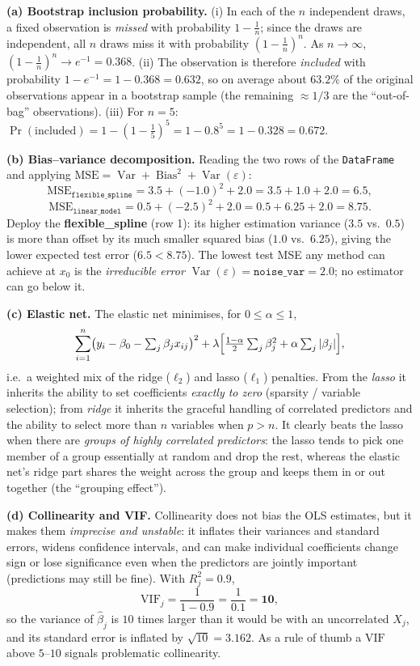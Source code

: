 \documentclass[11pt,a4paper]{article}
\begin{document}
\ifdefined\withsolutions
\begin{solutionbox}
\textbf{(a) Bootstrap inclusion probability.}
(i) In each of the $n$ independent draws, a fixed observation is \emph{missed} with probability
$1-\tfrac1n$; since the draws are independent, all $n$ draws miss it with probability
$(1-\tfrac1n)^n$. As $n\to\infty$, $(1-\tfrac1n)^n\to e^{-1}=\mathbf{0.368}$.
(ii) The observation is therefore \emph{included} with probability $1-e^{-1}=1-0.368=0.632$, so
on average about $\mathbf{63.2\%}$ of the original observations appear in a bootstrap sample
(the remaining $\approx 1/3$ are the ``out-of-bag'' observations).
(iii) For $n=5$: $\Pr(\text{included})=1-(1-\tfrac15)^5=1-0.8^{5}=1-0.328=\mathbf{0.672}$.

\medskip
\textbf{(b) Bias--variance decomposition.}
Reading the two rows of the \texttt{DataFrame} and applying
$\text{MSE}=\operatorname{Var}+\operatorname{Bias}^2+\operatorname{Var}(\varepsilon)$:
\[
  \text{MSE}_{\texttt{flexible\_spline}}=3.5+(-1.0)^2+2.0=3.5+1.0+2.0=\mathbf{6.5},
\]
\[
  \text{MSE}_{\texttt{linear\_model}}=0.5+(-2.5)^2+2.0=0.5+6.25+2.0=\mathbf{8.75}.
\]
Deploy the \textbf{flexible\_spline} (row 1): its higher estimation variance ($3.5$ vs.\ $0.5$)
is more than offset by its much smaller squared bias ($1.0$ vs.\ $6.25$), giving the lower
expected test error ($6.5<8.75$). The lowest test MSE any method can achieve at $x_0$ is the
\emph{irreducible error} $\operatorname{Var}(\varepsilon)=\texttt{noise\_var}=\mathbf{2.0}$; no
estimator can go below it.

\medskip
\textbf{(c) Elastic net.}
The elastic net minimises, for $0\le\alpha\le 1$,
\[
  \sum_{i=1}^n\bigl(y_i-\beta_0-\textstyle\sum_j\beta_jx_{ij}\bigr)^2
  +\lambda\Bigl[\tfrac{1-\alpha}{2}\textstyle\sum_j\beta_j^2+\alpha\textstyle\sum_j|\beta_j|\Bigr],
\]
i.e.\ a weighted mix of the ridge ($\ell_2$) and lasso ($\ell_1$) penalties. From the
\emph{lasso} it inherits the ability to set coefficients \emph{exactly to zero} (sparsity /
variable selection); from \emph{ridge} it inherits the graceful handling of correlated
predictors and the ability to select more than $n$ variables when $p>n$. It clearly beats the
lasso when there are \emph{groups of highly correlated predictors}: the lasso tends to pick one
member of a group essentially at random and drop the rest, whereas the elastic net's ridge part
shares the weight across the group and keeps them in or out together (the ``grouping effect'').

\medskip
\textbf{(d) Collinearity and VIF.}
Collinearity does not bias the OLS estimates, but it makes them \emph{imprecise and unstable}:
it inflates their variances and standard errors, widens confidence intervals, and can make
individual coefficients change sign or lose significance even when the predictors are jointly
important (predictions may still be fine). With $R_j^2=0.9$,
\[
  \mathrm{VIF}_j=\frac{1}{1-0.9}=\frac{1}{0.1}=\mathbf{10},
\]
so the variance of $\hat\beta_j$ is $10$ times larger than it would be with an uncorrelated
$X_j$, and its standard error is inflated by $\sqrt{10}=\mathbf{3.162}$. As a rule of thumb a
$\mathrm{VIF}$ above $5$--$10$ signals problematic collinearity.


\end{solutionbox}
\end{document}
